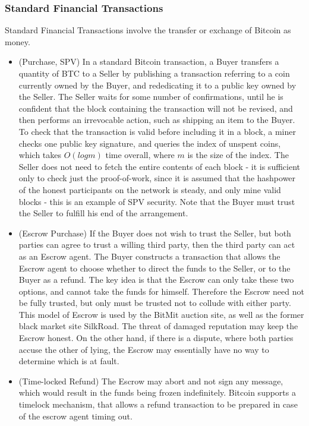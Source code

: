 \subsubsection{Standard Financial Transactions}
Standard Financial Transactions involve the transfer or exchange of Bitcoin as money.
\begin{itemize}
\item (Purchase, SPV) In a standard Bitcoin transaction, a Buyer transfers a quantity of BTC to a Seller by publishing a transaction referring to a coin currently owned by the Buyer, and rededicating it to a public key owned by the Seller. The Seller waits for some number of confirmations, until he is confident that the block containing the transaction will not be revised, and then performs an irrevocable action, such as shipping an item to the Buyer. To check that the transaction is valid before including it in a block, a miner checks one public key signature, and queries the index of unspent coins, which takes $O(log m)$ time overall, where $m$ is the size of the index. The Seller does not need to fetch the entire contents of each block - it is sufficient only to check just the proof-of-work, since it is assumed that the hashpower of the honest participants on the network is steady, and only mine valid blocks - this is an example of SPV security. Note that the Buyer must trust the Seller to fulfill his end of the arrangement.
\item (Escrow Purchase) If the Buyer does not wish to trust the Seller, but both parties can agree to trust a willing third party, then the third party can act as an Escrow agent. The Buyer constructs a transaction that allows the Escrow agent to choose whether to direct the funds to the Seller, or to the Buyer as a refund. The key idea is that the Escrow can only take these two options, and cannot take the funds for himself. Therefore the Escrow need not be fully trusted, but only must be trusted not to collude with either party. This model of Escrow is used by the BitMit auction site, as well as the former black market site SilkRoad. The threat of damaged reputation may keep the Escrow honest. On the other hand, if there is a dispute, where both parties accuse the other of lying, the Escrow may essentially have no way to determine which is at fault.
\item (Time-locked Refund) The Escrow may abort and not sign any message, which would result in the funds being frozen indefinitely. Bitcoin supports a timelock mechanism, that allows a refund transaction to be prepared in case of the escrow agent timing out.

\end{itemize}
